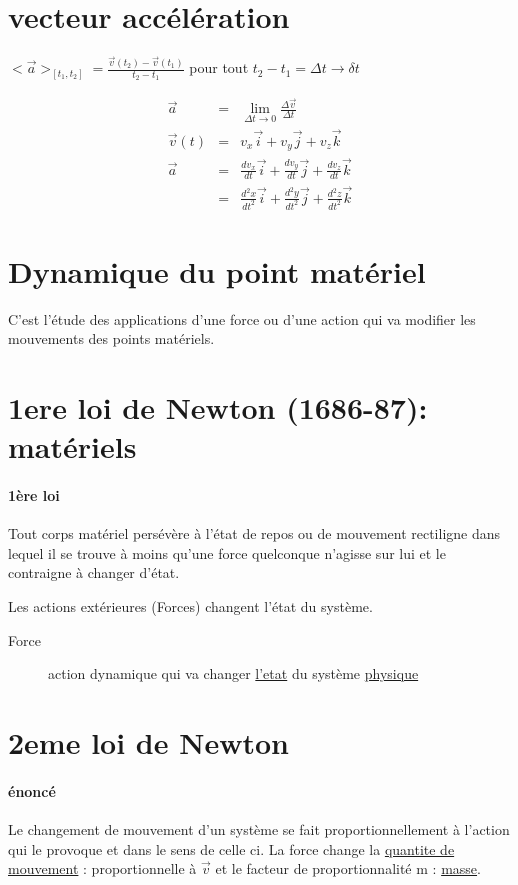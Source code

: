 \section{vecteur accélération} 

$<\vec{a}>_{[t_1, t_2]} = \frac{\vec{v}(t_2)-\vec{v}(t_1)}{t_2-t_1}$ pour tout $t_2-t_1 = \Delta t \to \delta t$

\[\begin{array}{rcl}
	\vec{a} &=& \lim_{\Delta t \to 0} \frac{\Delta \vec{v}}{\Delta t} \\
		\vec{v}(t) &=& v_x\vec{i}+v_y\vec{j} + v_z\vec{k} \\
		\vec{a} &=& \frac{dv_x}{dt}\vec{i}+\frac{dv_y}{dt}\vec{j}+\frac{dv_z}{dt}\vec{k} \\
		&=& \frac{d^2x}{dt^2}\vec{i}+\frac{d^2y}{dt^2}\vec{j}+\frac{d^2z}{dt^2}\vec{k} 
\end{array}\]

\section{Dynamique du point matériel}

C'est l'étude des applications d'une force ou d'une action qui va modifier les mouvements des points matériels.
\section{1ere loi de Newton (1686-87): matériels}

\paragraph{1ère loi} Tout corps matériel persévère à l'état de repos ou de mouvement rectiligne dans lequel il se trouve à moins qu'une force quelconque n'agisse sur lui et le contraigne à changer d'état.

Les actions extérieures (Forces) changent l'état du système.

\begin{description}
	\item[Force] action dynamique qui va changer \ul{l'etat} du système \ul{physique}
\end{description}

\section{2eme loi de Newton}
\paragraph{énoncé} Le changement de mouvement d'un système se fait proportionnellement à l'action qui le provoque et dans le sens de celle ci.
La force change la \ul{quantite de mouvement} : proportionnelle à $\vec{v}$ et le facteur de proportionnalité m : \ul{masse}.

